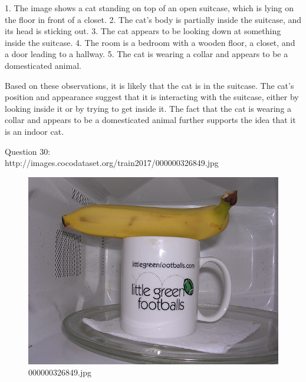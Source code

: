 \begin{enumerate}
        1. The image shows a cat standing on top of an open suitcase, which is lying on the floor in front of a closet.
        2. The cat’s body is partially inside the suitcase, and its head is sticking out.
        3. The cat appears to be looking down at something inside the suitcase.
        4. The room is a bedroom with a wooden floor, a closet, and a door leading to a hallway.
        5. The cat is wearing a collar and appears to be a domesticated animal.
        
        Based on these observations, it is likely that the cat is in the suitcase. The cat’s position and appearance suggest that it is interacting with the suitcase, either by looking inside it or by trying to get inside it. The fact that the cat is wearing a collar and appears to be a domesticated animal further supports the idea that it is an indoor cat.
    \end{enumerate}
    Question 30:\\http://images.cocodataset.org/train2017/000000326849.jpg
    \begin{figure}[h]
        \centering
        \includegraphics[width=0.8\linewidth]{../image set/easy/000000326849.jpg}
        \caption{000000326849.jpg}
    \end{figure}
